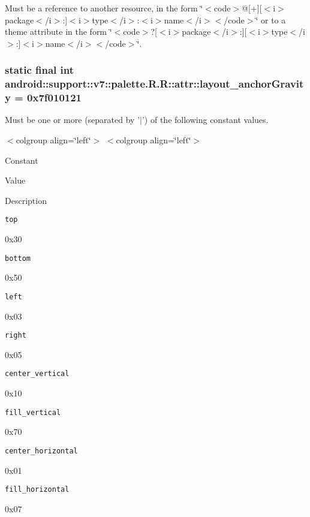 Must be a reference to another resource, in the form \char`\"{}$<$code$>$@\mbox{[}+\mbox{]}\mbox{[}$<$i$>$package$<$/i$>$:\mbox{]}$<$i$>$type$<$/i$>$:$<$i$>$name$<$/i$>$$<$/code$>$\char`\"{} or to a theme attribute in the form \char`\"{}$<$code$>$?\mbox{[}$<$i$>$package$<$/i$>$:\mbox{]}\mbox{[}$<$i$>$type$<$/i$>$:\mbox{]}$<$i$>$name$<$/i$>$$<$/code$>$\char`\"{}. \hypertarget{classandroid_1_1support_1_1v7_1_1palette_1_1_r_1_1attr_89dd83fdf79273eaa70d6b99ad970642}{
\subsubsection[{layout\_\-anchorGravity}]{\setlength{\rightskip}{0pt plus 5cm}static final int android::support::v7::palette.R.R::attr::layout\_\-anchorGravity = 0x7f010121}}
\label{classandroid_1_1support_1_1v7_1_1palette_1_1_r_1_1attr_89dd83fdf79273eaa70d6b99ad970642}


Must be one or more (separated by '$|$') of the following constant values. \begin{TabularC}{0}
\hline
\end{TabularC}
$<$colgroup align=\char`\"{}left\char`\"{}$>$ $<$colgroup align=\char`\"{}left\char`\"{}$>$ 

Constant

Value

Description 

{\tt top}

0x30

{\tt bottom}

0x50

{\tt left}

0x03

{\tt right}

0x05

{\tt center\_\-vertical}

0x10

{\tt fill\_\-vertical}

0x70

{\tt center\_\-horizontal}

0x01

{\tt fill\_\-horizontal}

0x07

